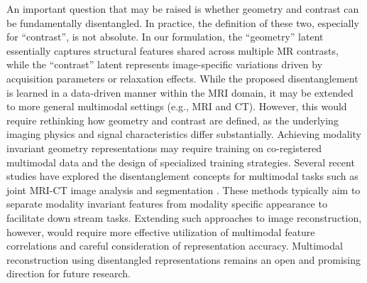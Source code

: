 \documentclass[journal,twoside,web]{ieeecolor}
\begin{document}
An important question that may be raised is whether geometry and contrast can be fundamentally disentangled. In practice, the definition of these two, especially for ``contrast'', is not absolute. In our formulation, the “geometry” latent essentially captures structural features shared across multiple MR contrasts, while the “contrast” latent represents image-specific variations driven by acquisition parameters or relaxation effects. While the proposed disentanglement is learned in a data-driven manner within the MRI domain, it may be extended to more general multimodal settings (e.g., MRI and CT). However, this would require rethinking how geometry and contrast are defined, as the underlying imaging physics and signal characteristics differ substantially. Achieving modality invariant geometry representations may require training on co-registered multimodal data and the design of specialized training strategies. Several recent studies have explored the disentanglement concepts for multimodal tasks such as joint MRI-CT image analysis and segmentation \cite{chartsias2019disentangled,jiang2020unified}. These methods typically aim to separate modality invariant features from modality specific appearance to facilitate down stream tasks. Extending such approaches to image reconstruction, however, would require more effective utilization of multimodal feature correlations and careful consideration of representation accuracy. Multimodal reconstruction using disentangled representations remains an open and promising direction for future research.
\end{document}

